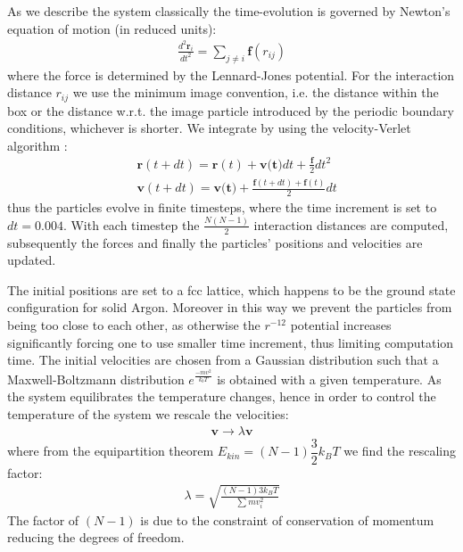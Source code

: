 \documentclass[11pt]{article}
\begin{document}
As we describe the system classically the time-evolution is governed by Newton's equation of motion (in reduced units): 
\begin{align*}
 \frac{d^2\textbf{r$_i$}}{dt^2}=\sum_{j\ne i}\textbf{f}(r_{ij})
\end{align*}
where the force is determined by the Lennard-Jones potential. For the interaction distance $r_{ij}$  we use the minimum image convention,  i.e. the distance within the box or the distance w.r.t. the image particle introduced by the periodic boundary conditions, whichever is shorter. We integrate by using the velocity-Verlet algorithm \cite{vv-algorithm}:
\begin{align*}
&\textbf{r}(t+dt)=\textbf{r}(t)+\textbf{v(t)}dt+\frac{\textbf{f}}{2}dt^2\\
&\textbf{v}(t+dt)=\textbf{v(t)}+\frac{\textbf{f}(t+dt)+\textbf{f}(t)}{2}dt
\end{align*}
thus the particles evolve in finite timesteps, where the time increment is set to $dt=0.004$. With each timestep the $\frac{N(N-1)}{2}$ interaction distances are computed, subsequently the forces and finally the particles' positions and velocities are updated. 

The initial positions are set to a fcc lattice, which happens to be the ground state configuration for solid Argon. Moreover in this way we prevent the particles from being too close to each other, as otherwise  the $r^{-12}$ potential  increases significantly forcing one to use smaller time increment, thus limiting computation time. The initial velocities are chosen from a Gaussian distribution such that a Maxwell-Boltzmann distribution $e^{\frac{-mv^2}{k_bT}}$ is obtained with a given temperature. As the system equilibrates the temperature changes, hence in order to control the temperature of the system we rescale the velocities: 
\begin{align*}
\textbf{v}\longrightarrow\lambda\textbf{v}
\end{align*}
where from the equipartition theorem $E_{kin}=(N-1)\dfrac{3}{2}k_BT$ we find the rescaling factor: 
\begin{align*}
\lambda=\sqrt{\frac{(N-1)3k_BT}{\sum mv_i^2}}
\end{align*}
The factor of $(N-1)$ is due to the constraint of conservation of momentum reducing the degrees of freedom. 
\end{document}
